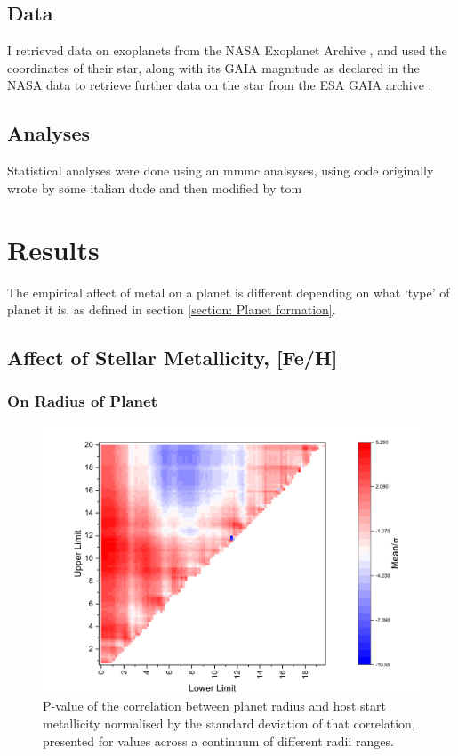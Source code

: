 \documentclass[a4paper,twocolumn,12pt]{article}
\begin{document}
\subsection{Data}
I retrieved data on exoplanets from the NASA Exoplanet Archive \cite{NASA Exoplanet Archive}, and used the coordinates of their star, along with its GAIA magnitude as declared in the NASA data to retrieve further data on the star from the ESA GAIA archive \cite{GAIA Archive}.

\subsection{Analyses}
Statistical analyses were done using an mmmc analsyses, using code originally wrote by some italian dude and then modified by tom



\section{Results}
The empirical affect of metal on a planet is different depending on what `type' of planet it is, as defined in section \ref{section: Planet formation}.
\subsection{Affect of Stellar Metallicity, [Fe/H]}

\subsubsection{On Radius of Planet}
\begin{figure}
    \includegraphics{FeH vs radius correlations.pdf}
    \caption{P-value of the correlation between planet radius and host start metallicity normalised by the standard deviation of that correlation, presented for values across a continuum of different radii ranges.}
    \label{fig:enter-label}
\end{figure}
\end{document}
